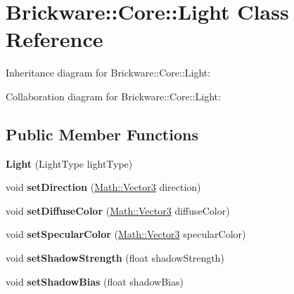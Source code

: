 \hypertarget{classBrickware_1_1Core_1_1Light}{}\section{Brickware\+:\+:Core\+:\+:Light Class Reference}
\label{classBrickware_1_1Core_1_1Light}


Inheritance diagram for Brickware\+:\+:Core\+:\+:Light\+:


Collaboration diagram for Brickware\+:\+:Core\+:\+:Light\+:
\subsection*{Public Member Functions}
\begin{DoxyCompactItemize}
\item 
\hypertarget{classBrickware_1_1Core_1_1Light_a00643b39e3c13315616dea4d7da9372a}{}{\bfseries Light} (Light\+Type light\+Type)\label{classBrickware_1_1Core_1_1Light_a00643b39e3c13315616dea4d7da9372a}

\item 
\hypertarget{classBrickware_1_1Core_1_1Light_ad081d8f78ab8678701ad10401cc5890b}{}void {\bfseries set\+Direction} (\hyperlink{classBrickware_1_1Math_1_1Vector3}{Math\+::\+Vector3} direction)\label{classBrickware_1_1Core_1_1Light_ad081d8f78ab8678701ad10401cc5890b}

\item 
\hypertarget{classBrickware_1_1Core_1_1Light_a15ffdad875fd966dfc977a13bc9d6031}{}void {\bfseries set\+Diffuse\+Color} (\hyperlink{classBrickware_1_1Math_1_1Vector3}{Math\+::\+Vector3} diffuse\+Color)\label{classBrickware_1_1Core_1_1Light_a15ffdad875fd966dfc977a13bc9d6031}

\item 
\hypertarget{classBrickware_1_1Core_1_1Light_a5678c73e3239e86136f866060155c95b}{}void {\bfseries set\+Specular\+Color} (\hyperlink{classBrickware_1_1Math_1_1Vector3}{Math\+::\+Vector3} specular\+Color)\label{classBrickware_1_1Core_1_1Light_a5678c73e3239e86136f866060155c95b}

\item 
\hypertarget{classBrickware_1_1Core_1_1Light_a2522502243c1cc377ab4a9047739fe80}{}void {\bfseries set\+Shadow\+Strength} (float shadow\+Strength)\label{classBrickware_1_1Core_1_1Light_a2522502243c1cc377ab4a9047739fe80}

\item 
\hypertarget{classBrickware_1_1Core_1_1Light_ab189de7a1f79bf080e68cd5ceefb2da0}{}void {\bfseries set\+Shadow\+Bias} (float shadow\+Bias)\label{classBrickware_1_1Core_1_1Light_ab189de7a1f79bf080e68cd5ceefb2da0}


\end{DoxyCompactItemize}
